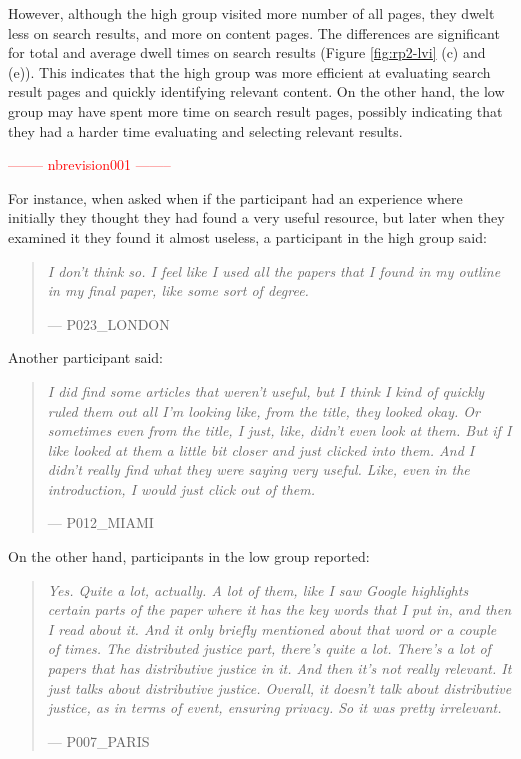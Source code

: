 \documentclass[letterpaper, nobind]{templates/ociamthesis}
\begin{document}
However, although the high group visited more number of all pages, they dwelt less on search results, and more on content pages.
The differences are significant for total and average dwell times on search results (Figure \ref{fig:rp2-lvi} (c) and (e)).
This indicates that the high group was more efficient at evaluating search result pages and quickly identifying relevant content.
On the other hand, the low group may have spent more time on search result pages, possibly indicating that they had a harder time evaluating and selecting relevant results.

\textcolor{red}{-------- nbrevision001 --------}

For instance, when asked when if the participant had an experience where initially they thought they had found a very useful resource, but later when they examined it they found it almost useless, a participant in the high group said:

\begin{quote}
\emph{I don't think so. I feel like I used all the papers that I found in my outline in my final paper, like some sort of degree.}

\hfill --- P023\_LONDON
\end{quote}

Another participant said:

\begin{quote}
\emph{I did find some articles that weren't useful, but I think I kind of quickly ruled them out all I'm looking like, from the title, they looked okay. Or sometimes even from the title, I just, like, didn't even look at them. But if I like looked at them a little bit closer and just clicked into them. And I didn't really find what they were saying very useful. Like, even in the introduction, I would just click out of them.}

\hfill --- P012\_MIAMI
\end{quote}

On the other hand, participants in the low group reported:

\begin{quote}
\emph{Yes. Quite a lot, actually. A lot of them, like I saw Google highlights certain parts of the paper where it has the key words that I put in, and then I read about it. And it only briefly mentioned about that word or a couple of times. The distributed justice part, there's quite a lot. There's a lot of papers that has distributive justice in it. And then it's not really relevant. It just talks about distributive justice. Overall, it doesn't talk about distributive justice, as in terms of event, ensuring privacy. So it was pretty irrelevant.}

\hfill --- P007\_PARIS
\end{quote}
\end{document}

